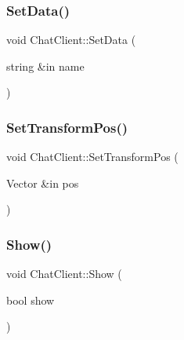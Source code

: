\hypertarget{class_chat_client_a4d1b907866e4f1f994077a5eb1a5f4eb}{}\label{class_chat_client_a4d1b907866e4f1f994077a5eb1a5f4eb} 
\subsubsection{\texorpdfstring{Set\+Data()}{SetData()}}
{\footnotesize\ttfamily void Chat\+Client\+::\+Set\+Data (\begin{DoxyParamCaption}\item[{string \&in}]{name }\end{DoxyParamCaption})}

\hypertarget{class_chat_client_a1553a17079f2fec4bf4d61b50ee0db1e}{}\label{class_chat_client_a1553a17079f2fec4bf4d61b50ee0db1e} 
\subsubsection{\texorpdfstring{Set\+Transform\+Pos()}{SetTransformPos()}}
{\footnotesize\ttfamily void Chat\+Client\+::\+Set\+Transform\+Pos (\begin{DoxyParamCaption}\item[{Vector \&in}]{pos }\end{DoxyParamCaption})}

\hypertarget{class_chat_client_abd289f27ec7aee5a84b4c7be11df3e50}{}\label{class_chat_client_abd289f27ec7aee5a84b4c7be11df3e50} 
\subsubsection{\texorpdfstring{Show()}{Show()}}
{\footnotesize\ttfamily void Chat\+Client\+::\+Show (\begin{DoxyParamCaption}\item[{bool}]{show }\end{DoxyParamCaption})}

